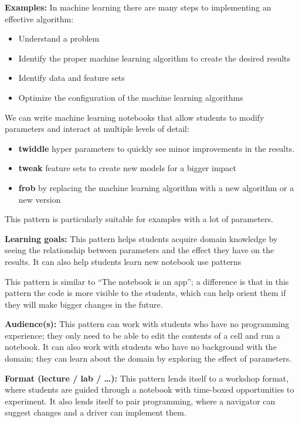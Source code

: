 \documentclass[]{book}
\providecommand{\tightlist}{%
  \setlength{\itemsep}{0pt}\setlength{\parskip}{0pt}}
\begin{document}
\textbf{Examples:} In machine learning there are many steps to
implementing an effective algorithm:

\begin{itemize}
\tightlist
\item
  Understand a problem
\item
  Identify the proper machine learning algorithm to create the desired
  results
\item
  Identify data and feature sets
\item
  Optimize the configuration of the machine learning algorithms
\end{itemize}

We can write machine learning notebooks that allow students to modify
parameters and interact at multiple levels of detail:

\begin{itemize}
\tightlist
\item
  \textbf{twiddle} hyper parameters to quickly see minor improvements in
  the results.
\item
  \textbf{tweak} feature sets to create new models for a bigger impact
\item
  \textbf{frob} by replacing the machine learning algorithm with a new
  algorithm or a new version
\end{itemize}

This pattern is particularly suitable for examples with a lot of
parameters.

\textbf{Learning goals:} This pattern helps students acquire domain
knowledge by seeing the relationship between parameters and the effect
they have on the results. It can also help students learn new notebook
use patterns

This pattern is similar to ``The notebook is an app''; a difference is
that in this pattern the code is more visible to the students, which can
help orient them if they will make bigger changes in the future.

\textbf{Audience(s):} This pattern can work with students who have no
programming experience; they only need to be able to edit the contents
of a cell and run a notebook. It can also work with students who have no
background with the domain; they can learn about the domain by exploring
the effect of parameters.

\textbf{Format (lecture / lab / \ldots{}):} This pattern lends itself to
a workshop format, where students are guided through a notebook with
time-boxed opportunities to experiment. It also lends itself to pair
programming, where a navigator can suggest changes and a driver can
implement them.
\end{document}
